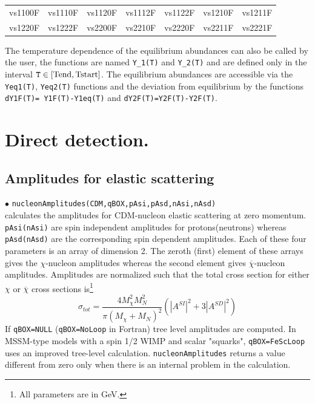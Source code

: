 \documentclass[12pt,a4paper]{article}
\begin{document}
\begin{center}
\begin{tabular}{ l l l l l l l }
vs1100F & vs1110F & vs1120F&vs1112F&vs1122F&vs1210F&vs1211F\\
vs1220F&vs1222F&vs2200F&vs2210F&vs2220F&vs2211F& vs2221F
\end{tabular}
\end{center} 

The  temperature dependence  of the equilibrium abundances can also be called by the user, the functions are named {\tt Y\_1(T)} and {\tt Y\_2(T)} and are defined only in the  interval ${\tt T}\in
[\rm{Tend},\rm{Tstart}]$. The equilibrium abundances are accessible via  the  { \tt Yeq1(T)}, { \tt Yeq2(T)} functions and the deviation from equilibrium  
by the functions
 {\tt dY1F(T)= Y1F(T)-Y1eq(T)}  and   { \tt dY2F(T)=Y2F(T)-Y2F(T)}.
 
 

\section{Direct detection.}
\subsection{Amplitudes for elastic scattering}
\noindent
 $\bullet$ \verb|nucleonAmplitudes(CDM,qBOX,pAsi,pAsd,nAsi,nAsd)|\\
calculates the amplitudes for CDM-nucleon elastic
scattering at zero momentum. \verb|pAsi(nAsi)| are spin
independent amplitudes for protons(neutrons) whereas
\verb|pAsd(nAsd)| are the corresponding spin dependent amplitudes.
Each of these four parameters is an array of 
dimension 2. The zeroth (first) element of these arrays gives the
$\chi$-nucleon amplitudes whereas the second element gives
$\overline{\chi}$-nucleon amplitudes. Amplitudes are normalized
such that the total cross section for either $\chi$ or $\overline
\chi$ cross sections is\footnote{All parameters are in GeV.}
\begin{equation}
\sigma_{tot}=\frac{4M_{\chi}^2 M_N^2}{\pi(M_{\chi}+M_N)^2}(|A^{SI}|^2+3|A^{SD}|^2)
\label{eq:norm}
\end{equation}
If \verb|qBOX=NULL| (\verb|qBOX=NoLoop| in Fortran) tree level amplitudes are computed. 
In MSSM-type models with a spin 1/2 WIMP and scalar "squarks",   
\verb|qBOX=FeScLoop| uses  an improved tree-level calculation.  
\verb|nucleonAmplitudes| returns a value different from zero only
when there is an internal problem in the calculation.
\end{document}
